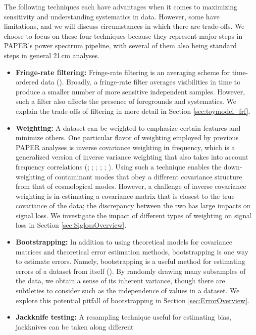 \documentclass[preprint2,numberedappendix,tighten]{aastex6}  %
\begin{document}
The following techniques each have advantages when it comes to maximizing sensitivity and understanding systematics in 
data. However, some have limitations, and we will discuss circumstances in which there are trade-offs. We choose to focus on 
these four techniques because they represent major steps in PAPER's power spectrum pipeline, with several of them also 
being standard steps in general 21\,cm analyses.
\begin{itemize}
\item \textbf{Fringe-rate filtering:} Fringe-rate filtering is an averaging scheme for time-ordered data 
(\citealt{parsons_et_al2016}). Broadly, a fringe-rate filter averages visibilities in time to produce a smaller number of more sensitive 
independent samples. However, such a filter also affects the presence 
of foregrounds and systematics. We explain the trade-offs of filtering in more detail in Section \ref{sec:toymodel_frf}.
\item \textbf{Weighting:} A dataset can be weighted to emphasize certain features and minimize others. One particular flavor of 
weighting employed by previous PAPER analyses is inverse covariance weighting in frequency, which is a generalized version of inverse variance 
weighting that also takes into account frequency correlations (\citealt{liu_tegmark2011}; \citealt{dillon_et_al2013a}; \citealt{liu_et_al2014a}; \citealt{liu_et_al2014b}; \citealt{dillon_et_al2014}; \citealt{dillon_et_al2015}). Using such a technique enables the down-weighting of contaminant modes that obey a different covariance structure from that of cosmological modes. However, a challenge of inverse covariance 
weighting is in estimating a covariance matrix that is closest to the true covariance of the data; the discrepancy between the two has large impacts on signal loss. We investigate the impact of different types of weighting on signal loss in Section \ref{sec:SiglossOverview}.
\item \textbf{Bootstrapping:} In addition to using theoretical models for covariance matrices and theoretical error estimation 
methods, bootstrapping is one way to estimate errors. Namely, bootstrapping is a useful method for estimating errors of a dataset from 
itself (\citealt{andrae2010}). By randomly drawing many subsamples of the data, we obtain a sense of its inherent variance, though there are subtleties to 
consider such as the independence of values in a dataset. We explore this potential pitfall of bootstrapping in Section \ref{sec:ErrorOverview}.
\item \textbf{Jackknife testing:} A resampling technique useful for estimating bias, jackknives can be taken along different 

\end{itemize}
\end{document}
